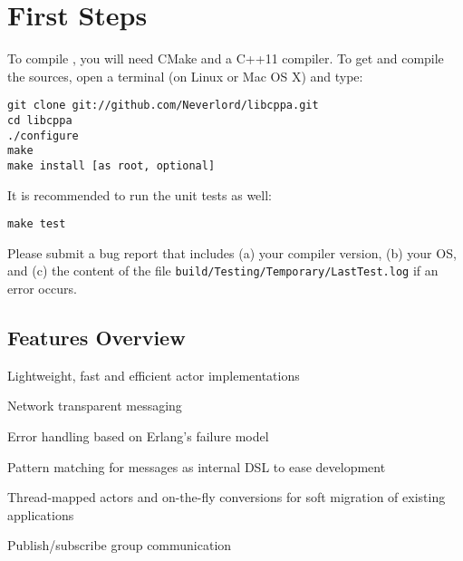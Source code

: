 \section{First Steps}



To compile \libcppa, you will need CMake and a C++11 compiler. To get and compile the sources, open a terminal (on Linux or Mac OS X) and type:

\begin{verbatim}
git clone git://github.com/Neverlord/libcppa.git
cd libcppa
./configure
make
make install [as root, optional]
\end{verbatim}

It is recommended to run the unit tests as well:

\begin{verbatim}
make test
\end{verbatim}

Please submit a bug report that includes (a) your compiler version, (b) your OS, and (c) the content of the file \texttt{build/Testing/Temporary/LastTest.log} if an error occurs.

\subsection{Features Overview}

\begin{itemize*}
  \item Lightweight, fast and efficient actor implementations
  \item Network transparent messaging
  \item Error handling based on Erlang's failure model
  \item Pattern matching for messages as internal DSL to ease development
  \item Thread-mapped actors and on-the-fly conversions for soft migration of existing applications
  \item Publish/subscribe group communication
\end{itemize*}


